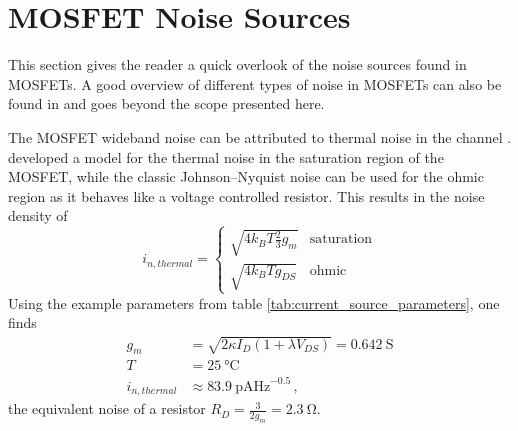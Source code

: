 \documentclass[12pt]{book}
\begin{document}
\section{MOSFET Noise Sources}
\label{sec:mosfet_noise}
This section gives the reader a quick overlook of the noise sources found in MOSFETs.
A good overview of different types of noise in MOSFETs can also be found in \cite{mosfet_noise_overview} and goes beyond the scope presented here.

The MOSFET wideband noise can be attributed to thermal noise in the channel \cite{mosfet_thermal_noise}. \citeauthor{mosfet_thermal_noise} developed a model for the thermal noise in the saturation region of the MOSFET, while the classic Johnson–Nyquist noise \cite{thermal_noise} can be used for the ohmic region as it behaves like a voltage controlled resistor. This results in the noise density of
\begin{equation}
    i_{n,thermal} = \begin{cases}
        \sqrt{4 k_B T \frac{2}{3} g_m} & \text{saturation}\\
        \sqrt{4 k_B T g_{DS}} & \text{ohmic}
    \end{cases}
\end{equation}
Using the example parameters from table \ref{tab:current_source_parameters}, one finds
\begin{align}
    g_m &= \sqrt{2 \kappa I_D \left(1+ \lambda V_{DS}\right)} = \qty{0.642}{\siemens} \nonumber\\
    T &= \qty{25}{\celsius} \nonumber\\
    i_{n,thermal} &\approx \qty[power-half-as-sqrt, per-mode=symbol]{83.9}{\pA \Hz \tothe{-0.5}} \,,
\end{align}
the equivalent noise of a resistor $R_D = \frac{3}{2 g_m} = \qty{2.3}{\ohm}$.


\end{document}
